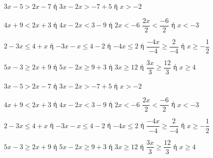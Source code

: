 \begin{alist}
\item $ 3x-5>2x-7 $ ή $ 3x-2x>-7+5 $ ή $ x>-2 $
\item $ 4x+9<2x+3 $ ή $ 4x-2x<3-9 $ ή $ 2x<-6 $ $ \dfrac{2x}{2}<\dfrac{-6}{2} $ ή $ x<-3 $
\item $ 2-3x\leq 4+x $ ή $ -3x-x\leq 4-2 $ ή $ -4x\leq 2 $ ή $ \dfrac{-4x}{-4}\geq \dfrac{2}{-4} $ ή $ x\geq-\dfrac{1}{2} $
\item $ 5x-3\geq 2x+9 $ ή $ 5x-2x\geq 9+3 $ ή $ 3x\geq 12 $ ή $ \dfrac{3x}{3}\geq\dfrac{12}{3} $ ή $ x\geq 4 $
\end{alist}
\begin{alist}
\item $ 3x-5>2x-7 $ ή $ 3x-2x>-7+5 $ ή $ x>-2 $
\item $ 4x+9<2x+3 $ ή $ 4x-2x<3-9 $ ή $ 2x<-6 $ $ \dfrac{2x}{2}<\dfrac{-6}{2} $ ή $ x<-3 $
\item $ 2-3x\leq 4+x $ ή $ -3x-x\leq 4-2 $ ή $ -4x\leq 2 $ ή $ \dfrac{-4x}{-4}\geq \dfrac{2}{-4} $ ή $ x\geq-\dfrac{1}{2} $
\item $ 5x-3\geq 2x+9 $ ή $ 5x-2x\geq 9+3 $ ή $ 3x\geq 12 $ ή $ \dfrac{3x}{3}\geq\dfrac{12}{3} $ ή $ x\geq 4 $
\end{alist}
